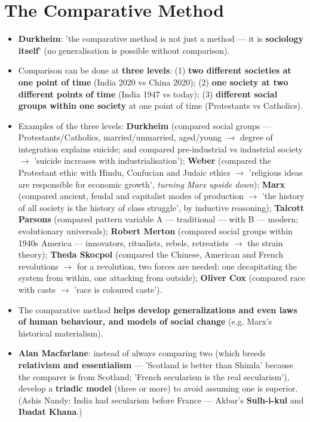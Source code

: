 \section{The Comparative Method}

\begin{KeyConcept}
\begin{itemize}
\item \textbf{Durkheim}: 'the comparative method is not just a method --- it is \textbf{sociology itself}' (no generalisation is possible without comparison).
\item Comparison can be done at \textbf{three levels}: (1) \textbf{two different societies at one point of time} (India 2020 vs China 2020); (2) \textbf{one society at two different points of time} (India 1947 vs today); (3) \textbf{different social groups within one society} at one point of time (Protestants vs Catholics).
\item Examples of the three levels: \textbf{Durkheim} (compared social groups --- Protestants/Catholics, married/unmarried, aged/young $\rightarrow$ degree of integration explains suicide; and compared pre-industrial vs industrial society $\rightarrow$ 'suicide increases with industrialisation'); \textbf{Weber} (compared the Protestant ethic with Hindu, Confucian and Judaic ethics $\rightarrow$ 'religious ideas are responsible for economic growth', \emph{turning Marx upside down}); \textbf{Marx} (compared ancient, feudal and capitalist modes of production $\rightarrow$ 'the history of all society is the history of class struggle', by inductive reasoning); \textbf{Talcott Parsons} (compared pattern variable A --- traditional --- with B --- modern; evolutionary universals); \textbf{Robert Merton} (compared social groups within 1940s America --- innovators, ritualists, rebels, retreatists $\rightarrow$ the strain theory); \textbf{Theda Skocpol} (compared the Chinese, American and French revolutions $\rightarrow$ for a revolution, two forces are needed: one decapitating the system from within, one attacking from outside); \textbf{Oliver Cox} (compared race with caste $\rightarrow$ 'race is coloured caste').
\item The comparative method \textbf{helps develop generalizations and even laws of human behaviour, and models of social change} (e.g. Marx's historical materialism).
\item \textbf{Alan Macfarlane}: instead of always comparing two (which breeds \textbf{relativism and essentialism} --- 'Scotland is better than Shimla' because the comparer is from Scotland; 'French secularism is the real secularism'), develop a \textbf{triadic model} (three or more) to avoid assuming one is superior. (Ashis Nandy: India had secularism before France --- Akbar's \textbf{Sulh-i-kul} and \textbf{Ibadat Khana}.)
\end{itemize}
\end{KeyConcept}

